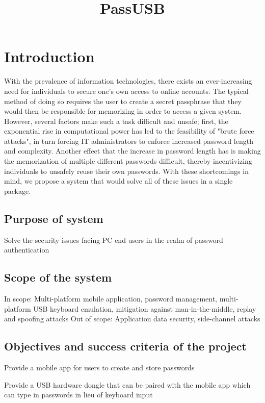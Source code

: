 \documentclass[stu]{apa7}
\title{PassUSB}
\begin{document}
\maketitle

\section{Introduction}

With the prevalence of information technologies, there exists an ever-increasing need for individuals to secure one's own access to online accounts. The typical method of doing so requires the user to create a secret passphrase that they would then be responsible for memorizing in order to access a given system. However, several factors make such a task difficult and unsafe; first, the exponential rise in computational power has led to the feasibility of "brute force attacks", in turn forcing IT administrators to enforce increased password length and complexity. Another effect that the increase in password length has is making the memorization of multiple different passwords difficult, thereby incentivizing individuals to unsafely reuse their own passwords. With these shortcomings in mind, we propose a system that would solve all of these issues in a single package.

\subsection{Purpose of system}
Solve the security issues facing PC end users in the realm of password authentication

\subsection{Scope of the system}
In scope: Multi-platform mobile application, password management, multi-platform USB keyboard emulation, mitigation against man-in-the-middle, replay and spoofing attacks
Out of scope: Application data security, side-channel attacks

\subsection{Objectives and success criteria of the project}

\begin{APAitemize}
  \item Provide a mobile app for users to create and store passwords
  \item Provide a USB hardware dongle that can be paired with the mobile app which can type in passwords in lieu of keyboard input
\end{APAitemize}
\end{document}
